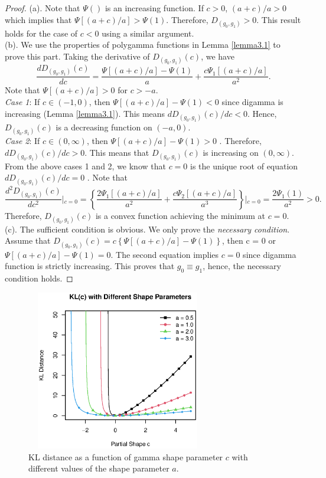 \documentclass{ps}
\theoremstyle{plain}%
\theoremstyle{definition}
\theoremstyle{remark}
\begin{document}
\begin{proof}
	(a). Note that $\Psi()$ is an increasing function. If $c > 0$, $(a + c)/a > 0$ which implies that $\Psi[(a+c)/a] > \Psi(1)$. Therefore, $D_{(g_0, g_1)} > 0$. This result holds for the case of $c < 0$ using a similar argument.	\\
	(b). We use the properties of polygamma functions in Lemma \ref{lemma3.1} to prove this part. Taking the derivative of $D_{(g_0, g_1)}(c)$, we have
	$$
	\frac{d D_{(g_0, g_1)}(c)}{d c} = \frac{\Psi[(a+c)/a]-\Psi(1)}{a} + \frac{c\Psi_1[(a+c)/a]}{a^2}.
	$$
	Note that $\Psi[(a+c)/a] > 0$ for $c > - a$.\\
	
	\noindent \emph{Case 1}: If $c \in (-1, 0)$, then $\Psi[(a+c)/a] - \Psi(1) < 0$  since digamma is increasing (Lemma \ref{lemma3.1}). This means $d D_{(g_0, g_1)}(c)/d c < 0$. Hence, $D_{(g_0, g_1)}(c)$  is a decreasing function on $(-a, 0)$. \\
	
	\noindent \emph{Case 2}: If $c \in (0, \infty)$, then $\Psi[(a+c)/a] - \Psi(1) > 0$ . Therefore,  $d D_{(g_0, g_1)}(c)/d c > 0$. This means that $D_{(g_0, g_1)}(c)$ is increasing on $(0, \infty)$. \\
	
	From the above cases 1 and 2, we know that $c = 0$ is the unique root of equation $d D_{(g_0, g_1)}(c)/d c = 0$ .  Note that
	$$
	\frac{d^2D_{(g_0, g_1)}(c)}{d c^2}\left| _{c=0} \right.=\left\{\frac{2\Psi_1[(a+c)/a]}{a^2}+\frac{c\Psi_2[(a+c)/a]}{a^3} \right\} \left| _{c=0} \right. = \frac{2\Psi_1(1)}{a^2} > 0.
	$$
	Therefore, $D_{(g_0, g_1)}(c)$ is a convex function achieving the minimum at $c = 0$.\\
	
	\noindent (c). The sufficient condition is obvious. We only prove the \emph{necessary condition}. Assume that $D_{(g_0, g_1)}(c) = c\left\{ \Psi[(a+c)/a] -\Psi(1)\right\}$, then c = 0 or   $\Psi[(a+c)/a]-\Psi(1)= 0$. The second equation implies $c = 0$ since digamma function is strictly increasing. This proves that $g_0 \equiv g_1$, hence, the necessary condition holds.   
\end{proof}

\begin{figure}[h!]
	\centering	\includegraphics[width=8cm,height=7cm]{Figure06_KL_dist.eps}
	\caption{KL distance as a function of gamma shape parameter $c$ with different values of the shape parameter $a$. }
	\label{Figure06_KL_dist}
\end{figure}
\end{document}
